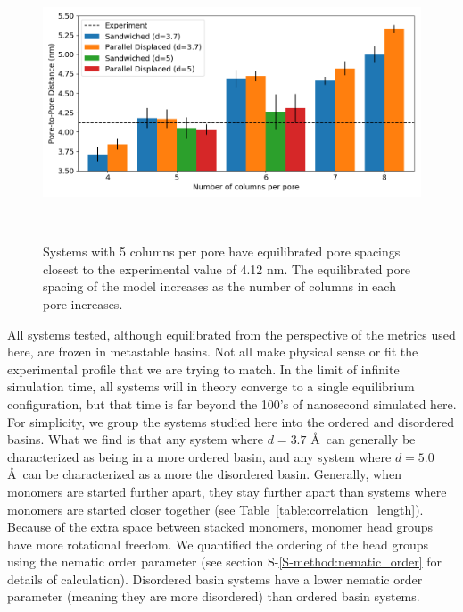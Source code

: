 \documentclass[journal=jpcbfk,manuscript=article]{achemso}
\begin{document}
  \begin{figure}[!htb]
	\centering
	\includegraphics[width=\linewidth]{p2p.png}
	\caption{Systems with 5 columns per pore have equilibrated pore spacings closest to
			 the experimental value of 4.12 nm. The equilibrated pore spacing of the model 	
			 increases as the number of columns in each pore increases.}~\label{fig:p2p}
  \end{figure}  
  
  All systems tested, although equilibrated from the perspective of the metrics used here, are
  frozen in metastable basins. Not all make physical sense or fit the experimental profile that 
  we are trying to match. In the limit of infinite simulation time, all systems will in theory 
  converge to a single equilibrium configuration, but that time is far beyond the 100's of 
  nanosecond simulated here. For simplicity, we group the systems studied here into the ordered
  and disordered basins. What we find is that any system where $\mathit{d}=3.7$ \AA~can generally 
  be characterized as being in a more ordered basin, and any system where $\mathit{d}=5.0$ \AA~can
  be characterized as a more the disordered basin. Generally, when monomers are started further 
  apart, they stay further apart than systems where monomers are started closer together 
  (see Table~\ref{table:correlation_length}). Because of the extra space between stacked 
  monomers, monomer head groups have more rotational freedom. We quantified the ordering of
  the head groups using the nematic order parameter (see section S-\ref{S-method:nematic_order}
  for details of calculation). Disordered basin systems have a lower nematic order parameter 
  (meaning they are more disordered) than ordered basin systems.

  
\end{document}
